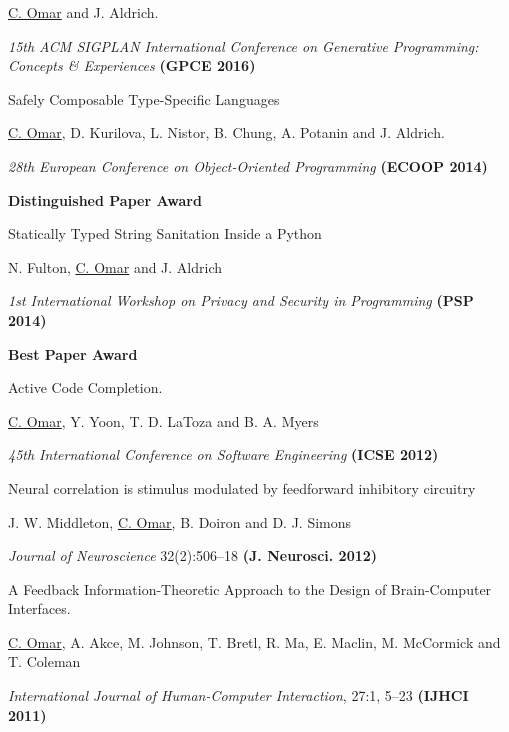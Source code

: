 \documentclass[10pt,letterpaper]{article}
\renewenvironment{itemize}{
  \begin{list}{}{
    \setlength{\leftmargin}{1.25em}
    \setlength{\itemsep}{0.25em}
    \setlength{\parskip}{0pt}
    \setlength{\parsep}{0.2em}
  }
}{
  \end{list}
}
\begin{document}
\begin{enumerate}
  \begin{itemize}
    \item \underline{C. Omar} and J. Aldrich.
    \item \textit{15th ACM SIGPLAN International Conference on Generative Programming: Concepts \& Experiences} {\textbf{(GPCE 2016)}}
  \end{itemize}
\item {Safely Composable Type-Specific Languages}
  \begin{itemize}
    \item \underline{C. Omar}, D. Kurilova, L. Nistor, B. Chung, A. Potanin and J. Aldrich.
    \item \textit{28th European Conference on Object-Oriented Programming} {\textbf{(ECOOP 2014)}}
    \item \textbf{Distinguished Paper Award}
  \end{itemize}
\item Statically Typed String Sanitation Inside a Python
  \begin{itemize}
    \item N. Fulton, \underline{C. Omar} and J. Aldrich
    \item \textit{1st International Workshop on Privacy and Security in Programming} {\textbf{(PSP 2014)}}
    \item \textbf{Best Paper Award}
  \end{itemize}  
\item {Active Code Completion}.
  \begin{itemize}
      \item \underline{C. Omar}, Y. Yoon, T. D. LaToza and B. A. Myers
      \item \textit{45th International Conference on Software Engineering} {\textbf{(ICSE 2012)}}
  \end{itemize}
\item {Neural correlation is stimulus modulated by feedforward inhibitory circuitry}
  \begin{itemize}
    \item J. W. Middleton, \underline{C. Omar}, B. Doiron and D. J. Simons
    \item \textit{Journal of Neuroscience} 32(2):506--18 {\textbf{(J. Neurosci. 2012)}}
  \end{itemize}
\item A Feedback Information-Theoretic Approach to the Design of Brain-Computer Interfaces.
  \begin{itemize}
    \item  \underline{C. Omar}, A. Akce, M. Johnson, T. Bretl, R. Ma, E. Maclin, M. McCormick and T. Coleman
    \item \textit{International Journal of Human-Computer Interaction}, 27:1, 5--23 {\textbf{(IJHCI 2011)}}
  \end{itemize}
\end{enumerate}
\end{document}
